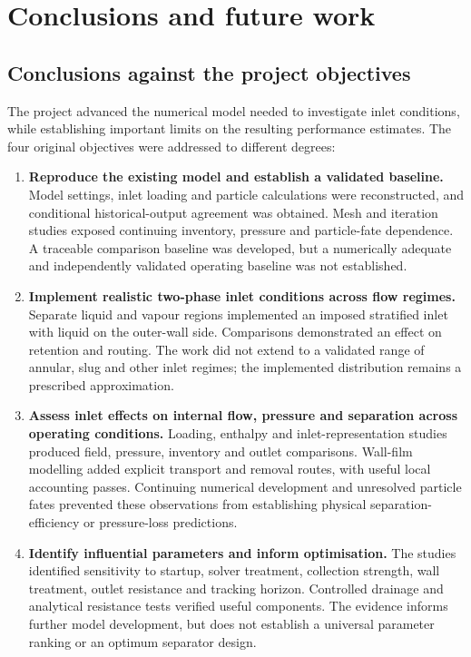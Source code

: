 \section{Conclusions and future work}

\subsection{Conclusions against the project objectives}

The project advanced the numerical model needed to investigate inlet conditions, while establishing important limits on the resulting performance estimates. The four original objectives were addressed to different degrees:

\begin{enumerate}
\def\labelenumi{\arabic{enumi}.}
\item
  \textbf{Reproduce the existing model and establish a validated baseline.} Model settings, inlet loading and particle calculations were reconstructed, and conditional historical-output agreement was obtained. Mesh and iteration studies exposed continuing inventory, pressure and particle-fate dependence. A traceable comparison baseline was developed, but a numerically adequate and independently validated operating baseline was not established.
\item
  \textbf{Implement realistic two-phase inlet conditions across flow regimes.} Separate liquid and vapour regions implemented an imposed stratified inlet with liquid on the outer-wall side. Comparisons demonstrated an effect on retention and routing. The work did not extend to a validated range of annular, slug and other inlet regimes; the implemented distribution remains a prescribed approximation.
\item
  \textbf{Assess inlet effects on internal flow, pressure and separation across operating conditions.} Loading, enthalpy and inlet-representation studies produced field, pressure, inventory and outlet comparisons. Wall-film modelling added explicit transport and removal routes, with useful local accounting passes. Continuing numerical development and unresolved particle fates prevented these observations from establishing physical separation-efficiency or pressure-loss predictions.
\item
  \textbf{Identify influential parameters and inform optimisation.} The studies identified sensitivity to startup, solver treatment, collection strength, wall treatment, outlet resistance and tracking horizon. Controlled drainage and analytical resistance tests verified useful components. The evidence informs further model development, but does not establish a universal parameter ranking or an optimum separator design.
\end{enumerate}

